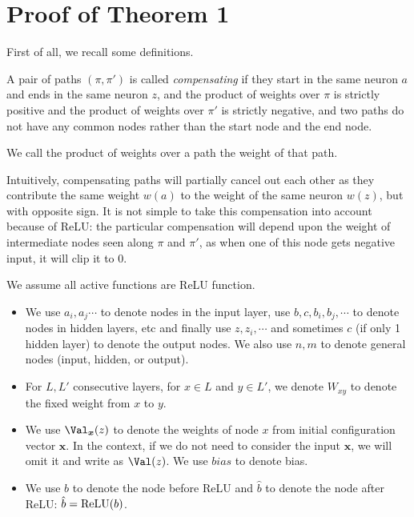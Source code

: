 


	
	
	
	
	
	
	\section{Proof of Theorem 1}
	
	First of all, we recall some definitions.
	
	
	
	
	\begin{definition}
		A pair of paths $(\pi,\pi')$
		is called {\em compensating} if they start in the same neuron $a$ and 
		ends in the same neuron $z$, and the product of weights over $\pi$ is strictly positive and the product of weights over $\pi'$ is strictly negative, and two paths do not have any common nodes rather than the start node and the end node.
		
		We call the product of weights over a path the weight of that path.
	\end{definition}
	
	Intuitively, compensating paths will partially cancel out each other as they contribute the same weight $w(a)$ to the weight of the same neuron $w(z)$, but with opposite sign. 
	It is not simple to take this compensation into account because of ReLU: the particular compensation will depend upon the weight of intermediate nodes seen along $\pi$ and $\pi'$, 
	as when one of this node gets negative input, it will clip it to 0.
	
	
	We assume all active functions are ReLU function.
	
	\begin{definition}
		
		\begin{itemize}
			\item  We use $a_i,a_j\cdots$ to denote nodes in the input layer, use $b,c,b_i,b_j,\cdots$ to denote nodes in hidden layers, etc and finally use $z,z_i,\cdots$ and sometimes $c$ (if only 1 hidden layer) to denote the output nodes. We also use $n,m$ to denote general nodes (input, hidden, or output).
			
			
			\item For $L,L'$ consecutive layers, for $x \in L$ and $y \in L'$, we denote 
			$W_{xy}$ to denote the fixed weight from $x$ to $y$. 
			
			\item  We use
			$\Val_{\boldsymbol{x}}(z)$ to denote the weights of node $x$ from initial configuration vector $\boldsymbol{x}$. In the context, if we do not need to consider the input $\boldsymbol{x}$, we will omit it and write as $\Val(z)$.
			We use $bias$ to denote bias.
			
			\item We use $b$ to denote the node before ReLU and $\hat{b}$ to denote the node after ReLU: $\hat{b} = \mathrm{ReLU}(b)$.
		\end{itemize}
		
	\end{definition}
	
